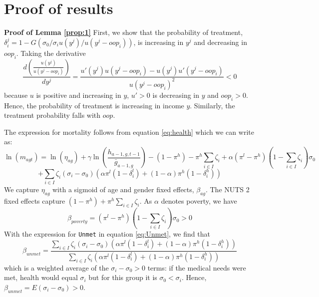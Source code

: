 \documentclass[a4paper,12pt]{article}
\begin{document}
\newpage
\appendix

\section{Proof of results}
\label{sec:orga03332a}

\textbf{Proof of Lemma \ref{prop:1}}
First, we show that the probability of treatment, \(\delta_i^j = 1-G(\sigma_0/\sigma_i u(y^j)/u(y^j-oop_{i}))\), is increasing in \(y^j\) and decreasing in \(oop_{i}\). Taking the derivative
\begin{equation}
\label{eq:treatment_y}
\frac{d \left( \frac{u(y^{j})}{u(y^{j}-oop_{i})} \right)}{dy^j} = \frac{u'(y^{j})u(y^j-oop_{i}) - u(y^{j})u'(y^{j}-oop_{i})}{u(y^j-oop_{i})^2} < 0
\end{equation}
because \(u\) is positive and increasing in \(y\), \(u'>0\) is decreasing in \(y\) and \(oop_{i} >0\). Hence, the probability of treatment is increasing in income \(y\). Similarly, the treatment probability falls with \(oop\).

The expression for mortality follows from equation \eqref{eq:health} which we can write as:
\begin{equation}
\ln(m_{agt}) = \ln({\eta}_{ag}) + \gamma \ln \left( \frac{h_{a-1,g,t-1}}{\bar g_{a-1,g}}\right)- (1-\pi^h)-\pi^h \sum_{i \in I} \zeta_i + \alpha (\pi^l-\pi^h)(1-\sum_{i \in I} \zeta_i) \sigma_0
 \end{equation}
\begin{equation*}
+ \sum_{i \in I} \zeta_i (\sigma_i-\sigma_0) (\alpha \pi^l (1-\delta_i^l) + (1-\alpha) \pi^h (1-\delta_i^h))
\end{equation*}
We capture \({\eta}_{ag}\) with a sigmoid of age and gender fixed effects, \(\beta_{ag}\). The NUTS 2 fixed effects capture \((1-\pi^h)+\pi^h \sum_{i \in I} \zeta_i\). As \(\alpha\) denotes poverty, we have
\begin{equation}
\beta_{poverty} = (\pi^l-\pi^h)(1-\sum_{i \in I} \zeta_i) \sigma_0 > 0
\end{equation}
With the expression for \texttt{Unmet} in equation \eqref{eq:Unmet}, we find that
\begin{equation}
\beta_{unmet} = \frac{\sum_{i \in I} \zeta_i (\sigma_i-\sigma_0) (\alpha \pi^l (1-\delta_i^l) + (1-\alpha) \pi^h (1-\delta_i^h))}{\sum_{i \in I} \zeta_i (\alpha \pi^l (1-\delta_i^l) + (1-\alpha) \pi^h (1-\delta_i^h))}
\end{equation}
which is a weighted average of the \(\sigma_i-\sigma_0>0\) terms: if the medical needs were met, health would equal \(\sigma_i\) but for this group it is \(\sigma_0 < \sigma_{i}\). Hence, \(\beta_{unmet} = E(\sigma_i-\sigma_0)>0\).
\end{document}
